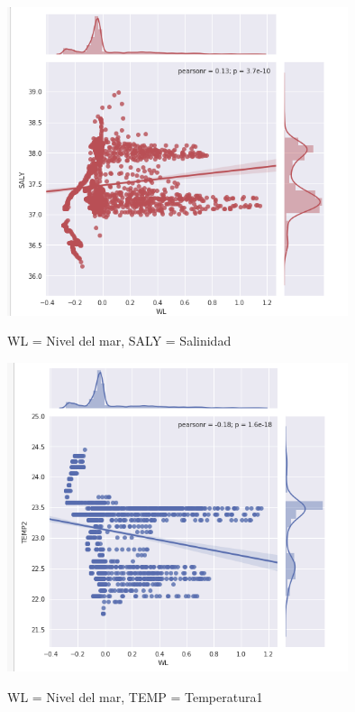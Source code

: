 \documentclass{article}
\begin{document}
\begin{center}
	\includegraphics[width=10cm]{RegWLSALY.png}
    
    WL = Nivel del mar, SALY = Salinidad
\end{center}

\begin{center}
	\includegraphics[width=10cm]{RegWLTEMP.png}
    
    WL = Nivel del mar, TEMP = Temperatura1
\end{center}
\vspace{0.3cm}
\end{document}
